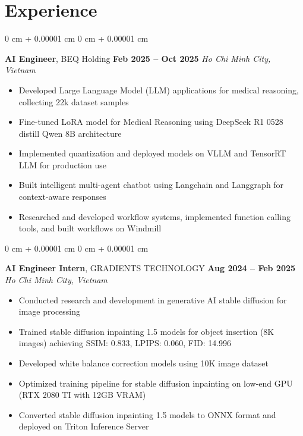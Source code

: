 \documentclass[10pt, letterpaper]{article}
\newenvironment{highlightsforbulletentries}{
    \begin{itemize}[
        topsep=0.10 cm,
        parsep=0.10 cm,
        partopsep=0pt,
        itemsep=0pt,
        leftmargin=10pt
    ]
}{
    \end{itemize}
} %
\newenvironment{onecolentry}{
    \begin{adjustwidth}{
        0 cm + 0.00001 cm
    }{
        0 cm + 0.00001 cm
    }
}{
    \end{adjustwidth}
} %
\newenvironment{experienceentry}{
    \begin{onecolentry}
}{
    \end{onecolentry}
} %
\begin{document}
    
    \section{Experience}

        \begin{experienceentry}
            \textbf{AI Engineer}, BEQ Holding \hfill \textbf{Feb 2025 -- Oct 2025}
            \textit{Ho Chi Minh City, Vietnam}
            \begin{highlightsforbulletentries}
                \item Developed Large Language Model (LLM) applications for medical reasoning, collecting 22k dataset samples
                \item Fine-tuned LoRA model for Medical Reasoning using DeepSeek R1 0528 distill Qwen 8B architecture
                \item Implemented quantization and deployed models on VLLM and TensorRT LLM for production use
                \item Built intelligent multi-agent chatbot using Langchain and Langgraph for context-aware responses
                \item Researched and developed workflow systems, implemented function calling tools, and built workflows on Windmill
            \end{highlightsforbulletentries}
        \end{experienceentry}

        \begin{experienceentry}
            \textbf{AI Engineer Intern}, GRADIENTS TECHNOLOGY \hfill \textbf{Aug 2024 -- Feb 2025}
            \textit{Ho Chi Minh City, Vietnam}
            \begin{highlightsforbulletentries}
                \item Conducted research and development in generative AI stable diffusion for image processing
                \item Trained stable diffusion inpainting 1.5 models for object insertion (8K images) achieving SSIM: 0.833, LPIPS: 0.060, FID: 14.996
                \item Developed white balance correction models using 10K image dataset
                \item Optimized training pipeline for stable diffusion inpainting on low-end GPU (RTX 2080 TI with 12GB VRAM)
                \item Converted stable diffusion inpainting 1.5 models to ONNX format and deployed on Triton Inference Server
            \end{highlightsforbulletentries}
        \end{experienceentry}
\end{document}
